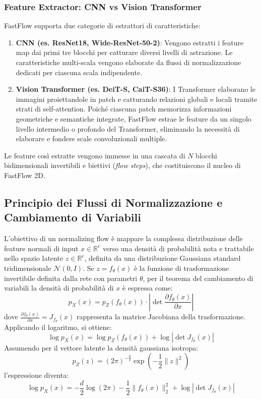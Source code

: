 \subsubsection{Feature Extractor: CNN vs Vision Transformer}
FastFlow supporta due categorie di estrattori di caratteristiche:
\begin{enumerate}
    \item \textbf{CNN (es. ResNet18, Wide-ResNet-50-2)}: Vengono estratti i feature map dai primi tre blocchi per catturare diversi livelli di astrazione. Le caratteristiche multi-scala vengono elaborate da flussi di normalizzazione dedicati per ciascuna scala indipendente.
    \item \textbf{Vision Transformer (es. DeiT-S, CaiT-S36)}: I Transformer elaborano le immagini proiettandole in patch e catturando relazioni globali e locali tramite strati di self-attention. Poiché ciascuna patch memorizza informazioni geometriche e semantiche integrate, FastFlow estrae le feature da un singolo livello intermedio o profondo del Transformer, eliminando la necessità di elaborare e fondere scale convoluzionali multiple.
\end{enumerate}

Le feature così estratte vengono immesse in una cascata di $N$ blocchi bidimensionali invertibili e biettivi (\textit{flow steps}), che costituiscono il nucleo di FastFlow 2D.

\subsection{Principio dei Flussi di Normalizzazione e Cambiamento di Variabili}
L'obiettivo di un normalizing flow è mappare la complessa distribuzione delle feature normali di input $x \in \mathbb{R}^c$ verso una densità di probabilità nota e trattabile nello spazio latente $z \in \mathbb{R}^c$, definita da una distribuzione Gaussiana standard tridimensionale $\mathcal{N}(0, I)$.
Se $z = f_\theta(x)$ è la funzione di trasformazione invertibile definita dalla rete con parametri $\theta$, per il teorema del cambiamento di variabili la densità di probabilità di $x$ è espressa come:
\begin{equation}
    p_X(x) = p_Z(f_\theta(x)) \cdot \left| \det \frac{\partial f_\theta(x)}{\partial x} \right|
\end{equation}
dove $\frac{\partial f_\theta(x)}{\partial x} = J_{f_\theta}(x)$ rappresenta la matrice Jacobiana della trasformazione. Applicando il logaritmo, si ottiene:
\begin{equation}
    \log p_X(x) = \log p_Z(f_\theta(x)) + \log \left| \det J_{f_\theta}(x) \right|
\end{equation}
Assumendo per il vettore latente la densità gaussiana isotropa:
\begin{equation}
    p_Z(z) = (2\pi)^{-\frac{d}{2}} \exp\left(-\frac{1}{2}\|z\|^2\right)
\end{equation}
l'espressione diventa:
\begin{equation}
    \log p_X(x) = -\frac{d}{2}\log(2\pi) - \frac{1}{2}\|f_\theta(x)\|_2^2 + \log \left| \det J_{f_\theta}(x) \right|
\end{equation}

